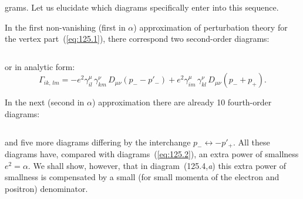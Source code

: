 
\noindent grams. Let us elucidate which diagrams specifically enter into this sequence.

In the first non-vanishing (first in $\alpha$) approximation of perturbation theory for the vertex part~(\ref{eq:125.1}), there correspond two second-order diagrams:


\begin{equation}
\label{eq:125.2}
\end{equation}

\noindent or in analytic form:
\begin{equation}
\Gamma_{ik,\,lm} = -e^2 \gamma^\mu_{il}\,\gamma^\nu_{km}\,D_{\mu\nu}(p_- - p'_-) + e^2 \gamma^\mu_{im}\,\gamma^\nu_{kl}\,D_{\mu\nu}(p_- + p_+).
\label{eq:125.3}
\end{equation}

In the next (second in $\alpha$) approximation there are already 10 fourth-order diagrams:


\begin{equation}
\label{eq:125.4}
\end{equation}

\noindent and five more diagrams differing by the interchange $p_- \leftrightarrow -p'_+$. All these diagrams have, compared with diagrams~(\ref{eq:125.2}), an extra power of smallness $e^2 = \alpha$. We shall show, however, that in diagram~(125.4,\textit{a}) this extra power of smallness is compensated by a small (for small momenta of the electron and positron) denominator.

